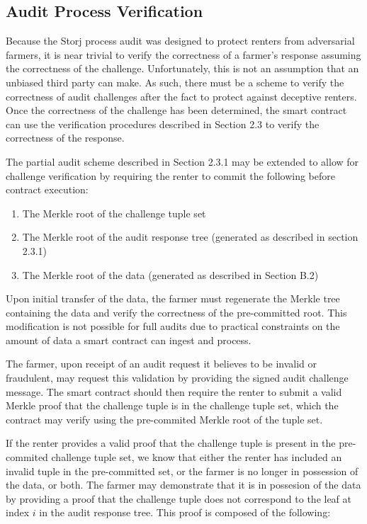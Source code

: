 \documentclass[a4paper,10pt]{article}
\begin{document}
\subsection{Audit Process Verification}

Because the Storj process audit was designed to protect renters from adversarial farmers, it is near trivial to verify the correctness of a farmer's response assuming the correctness of the challenge. Unfortunately, this is not an assumption that an unbiased third party can make. As such, there must be a scheme to verify the correctness of audit challenges after the fact to protect against deceptive renters. Once the correctness of the challenge has been determined, the smart contract can use the verification procedures described in Section 2.3 to verify the correctness of the response.

The partial audit scheme described in Section 2.3.1 may be extended to allow for challenge verification by requiring the renter to commit the following before contract execution:

\begin{enumerate}
  \item The Merkle root of the challenge tuple set
  \item The Merkle root of the audit response tree (generated as described in section 2.3.1)
  \item The Merkle root of the data (generated as described in Section B.2)
\end{enumerate}

Upon initial transfer of the data, the farmer must regenerate the Merkle tree containing the data and verify the correctness of the pre-committed root. This modification is not possible for full audits due to practical constraints on the amount of data a smart contract can ingest and process.

The farmer, upon receipt of an audit request it believes to be invalid or fraudulent, may request this validation by providing the signed audit challenge message. The smart contract should then require the renter to submit a valid Merkle proof that the challenge tuple is in the challenge tuple set, which the contract may verify using the pre-commited Merkle root of the tuple set.

If the renter provides a valid proof that the challenge tuple is present in the pre-commited challenge tuple set, we know that either the renter has included an invalid tuple in the pre-committed set, or the farmer is no longer in possession of the data, or both. The farmer may demonstrate that it is in possesion of the data by providing a proof that the challenge tuple does not correspond to the leaf at index $ i $ in the audit response tree. This proof is composed of the following:
\end{document}
